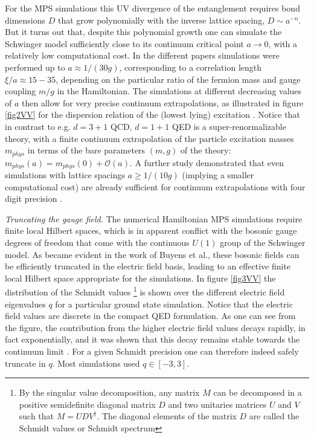 \documentclass[epj,final]{svjour}
\begin{document}
For the MPS simulations this UV divergence of the entanglement requires bond dimensions $D$ that grow polynomially with the inverse lattice spacing, $D\sim a^{-n}$. But it turns out that, despite this polynomial growth one can simulate the Schwinger model sufficiently close to its continuum critical point $a\rightarrow 0$, with a relatively low computational cost.  In the different papers simulations were performed up to $a\approx 1/(30 g)$, corresponding to a correlation length $\xi/a\approx 15-35$, depending on the particular ratio of the fermion mass and gauge coupling $m/g$ in the Hamiltonian. The simulations at different decreasing values of $a$ then allow for very precise continuum extrapolations, as illustrated in figure \ref{fig2VV} for the dispersion relation of the (lowest lying) excitation \cite{buyens2014matrix}. Notice that in contrast to e.g. $d=3+1$ QCD,  $d=1+1$ QED is a super-renormalizable theory, with a finite continuum extrapolation of the particle excitation masses $m_{phys}$ in terms of the bare parameters $(m,g)$ of the theory: $m_{phys}(a)=m_{phys}(0)+ \mathcal{O}(a)$.   A further study demonstrated that even simulations with lattice spacings $a\geq 1/(10 g)$ (implying a smaller computational cost) are already sufficient for continuum extrapolations with four digit precision \cite{Buyens2017b}. 

\emph{ Truncating the gauge field.} The numerical Hamiltonian MPS simulations require finite local Hilbert spaces, which is in apparent conflict with the bosonic gauge degrees of freedom that come with the continuous $U(1)$ group of the Schwinger model.  As became evident in the work of Buyens et al., these bosonic fields can be efficiently truncated in the electric field basis, leading to an effective finite local Hilbert space appropriate for the simulations. In figure \ref{fig3VV} the distribution of the Schmidt values \footnote{By the singular value decomposition, any matrix $M$ can be decomposed in a positive semidefinite diagonal matrix $D$ and two unitaries matrices $U$ and $V$ such that $M=UDV^{\dagger}$. The diagonal elements of the matrix $D$ are called the Schmidt values or Schmidt spectrum} is shown over the different electric field eigenvalues $q$ for a particular ground state simulation. Notice that the electric field values are discrete in the compact QED formulation. As one can see from the figure, the contribution from the higher electric field values decays rapidly, in fact exponentially, and it was shown that this decay remains stable towards the continuum limit \cite{Buyens2017b}. For a given Schmidt precision one can therefore indeed safely truncate in $q$. Most simulations used $q\in [-3,3]$.    
\end{document}
